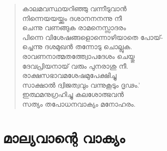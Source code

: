 \begin{verse}
കാലമവസ്ഥയറിഞ്ഞു വന്നീടുവാന്‍\\
നിന്നെയയയ്ക്കും ദശാനനനന്നു നീ\\
ചെന്നു വണങ്ങുക രാമനെസ്സാദരം\\
പിന്നെ വിശേഷങ്ങളൊന്നൊഴിയാതെ പോയ്-\\
ച്ചെന്നു ദശമുഖന്‍ തന്നോടു ചൊല്ലുക.\\
രാവണനാത്മതത്ത്വോപദേശം ചെയ്തു\\
ദേവപ്രിയനായ് വരും പുനരാശു നീ.\\
രാക്ഷസഭാവമശേഷമുപേക്ഷിച്ചു\\
സാക്ഷാല്‍ ദ്വിജത്വവും വന്നുകൂടും ദൃഢം.’\\
ഇത്ഥമനുഗ്രഹിച്ചു കലശോത്ഭവന്‍\\
സത്യം തപോധനവാക്യം മനോഹരം.
\end{verse}


\section{മാല്യവാന്റെ വാക്യം}


